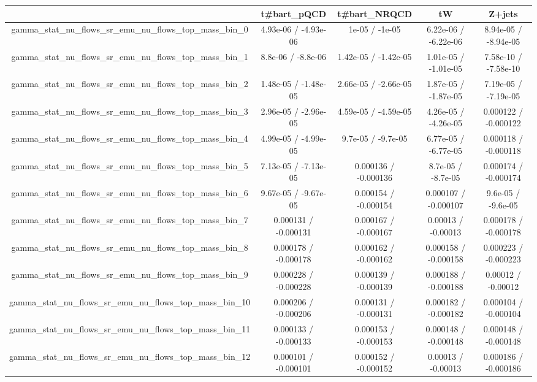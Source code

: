 \documentclass[10pt]{article}
\begin{document}
\begin{table}[htbp]
\begin{center}
\begin{tabular}{|c|c|c|c|c|}
\hline 
      & t#bar{t}_{pQCD}      & t#bar{t}_{NRQCD}      & tW      & Z+jets \\ 
\hline 
  gamma_stat_nu_flows_sr_emu_nu_flows_top_mass_bin_0 & 4.93e-06 / -4.93e-06 & 1e-05 / -1e-05 & 6.22e-06 / -6.22e-06 & 8.94e-05 / -8.94e-05 \\ 
  gamma_stat_nu_flows_sr_emu_nu_flows_top_mass_bin_1 & 8.8e-06 / -8.8e-06 & 1.42e-05 / -1.42e-05 & 1.01e-05 / -1.01e-05 & 7.58e-10 / -7.58e-10 \\ 
  gamma_stat_nu_flows_sr_emu_nu_flows_top_mass_bin_2 & 1.48e-05 / -1.48e-05 & 2.66e-05 / -2.66e-05 & 1.87e-05 / -1.87e-05 & 7.19e-05 / -7.19e-05 \\ 
  gamma_stat_nu_flows_sr_emu_nu_flows_top_mass_bin_3 & 2.96e-05 / -2.96e-05 & 4.59e-05 / -4.59e-05 & 4.26e-05 / -4.26e-05 & 0.000122 / -0.000122 \\ 
  gamma_stat_nu_flows_sr_emu_nu_flows_top_mass_bin_4 & 4.99e-05 / -4.99e-05 & 9.7e-05 / -9.7e-05 & 6.77e-05 / -6.77e-05 & 0.000118 / -0.000118 \\ 
  gamma_stat_nu_flows_sr_emu_nu_flows_top_mass_bin_5 & 7.13e-05 / -7.13e-05 & 0.000136 / -0.000136 & 8.7e-05 / -8.7e-05 & 0.000174 / -0.000174 \\ 
  gamma_stat_nu_flows_sr_emu_nu_flows_top_mass_bin_6 & 9.67e-05 / -9.67e-05 & 0.000154 / -0.000154 & 0.000107 / -0.000107 & 9.6e-05 / -9.6e-05 \\ 
  gamma_stat_nu_flows_sr_emu_nu_flows_top_mass_bin_7 & 0.000131 / -0.000131 & 0.000167 / -0.000167 & 0.00013 / -0.00013 & 0.000178 / -0.000178 \\ 
  gamma_stat_nu_flows_sr_emu_nu_flows_top_mass_bin_8 & 0.000178 / -0.000178 & 0.000162 / -0.000162 & 0.000158 / -0.000158 & 0.000223 / -0.000223 \\ 
  gamma_stat_nu_flows_sr_emu_nu_flows_top_mass_bin_9 & 0.000228 / -0.000228 & 0.000139 / -0.000139 & 0.000188 / -0.000188 & 0.00012 / -0.00012 \\ 
  gamma_stat_nu_flows_sr_emu_nu_flows_top_mass_bin_10 & 0.000206 / -0.000206 & 0.000131 / -0.000131 & 0.000182 / -0.000182 & 0.000104 / -0.000104 \\ 
  gamma_stat_nu_flows_sr_emu_nu_flows_top_mass_bin_11 & 0.000133 / -0.000133 & 0.000153 / -0.000153 & 0.000148 / -0.000148 & 0.000148 / -0.000148 \\ 
  gamma_stat_nu_flows_sr_emu_nu_flows_top_mass_bin_12 & 0.000101 / -0.000101 & 0.000152 / -0.000152 & 0.00013 / -0.00013 & 0.000186 / -0.000186 \\ 

\end{tabular}
\end{center}
\end{table}
\end{document}
